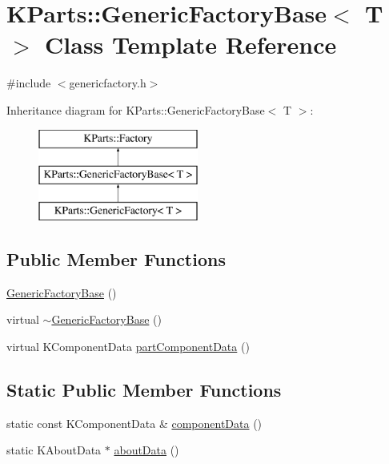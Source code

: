 \hypertarget{classKParts_1_1GenericFactoryBase}{\section{\-K\-Parts\-:\-:\-Generic\-Factory\-Base$<$ \-T $>$ \-Class \-Template \-Reference}
\label{classKParts_1_1GenericFactoryBase}
}


{\ttfamily \#include $<$genericfactory.\-h$>$}

\-Inheritance diagram for \-K\-Parts\-:\-:\-Generic\-Factory\-Base$<$ \-T $>$\-:\begin{figure}[H]
\begin{center}
\leavevmode
\includegraphics[height=3.000000cm]{classKParts_1_1GenericFactoryBase}
\end{center}
\end{figure}
\subsection*{\-Public \-Member \-Functions}
\begin{DoxyCompactItemize}
\item 
\hyperlink{classKParts_1_1GenericFactoryBase_af55233417c6cfae4f515ffe332987261}{\-Generic\-Factory\-Base} ()
\item 
virtual \hyperlink{classKParts_1_1GenericFactoryBase_a684bf9bd99f8c86d64a1fbdac6ee2901}{$\sim$\-Generic\-Factory\-Base} ()
\item 
virtual \-K\-Component\-Data \hyperlink{classKParts_1_1GenericFactoryBase_a0b1d32c7adf2255890bdd3898757feae}{part\-Component\-Data} ()
\end{DoxyCompactItemize}
\subsection*{\-Static \-Public \-Member \-Functions}
\begin{DoxyCompactItemize}
\item 
static const \-K\-Component\-Data \& \hyperlink{classKParts_1_1GenericFactoryBase_ad4a0ca70dec2fe8f4e0d4293e17eb776}{component\-Data} ()
\item 
static \-K\-About\-Data $\ast$ \hyperlink{classKParts_1_1GenericFactoryBase_ad5b89e87d73a76f3548c1afd09858020}{about\-Data} ()
\end{DoxyCompactItemize}

